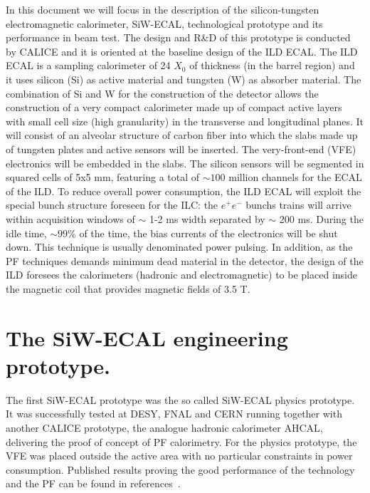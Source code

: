 \documentclass[a4paper,11pt]{article}
\begin{document}
In this document we will focus in the description of the silicon-tungsten electromagnetic calorimeter, SiW-ECAL, technological prototype
and its performance in beam test. The design and R\&D of this prototype is conducted by CALICE and it is oriented at the baseline design of the ILD ECAL.
The ILD ECAL is a sampling calorimeter of 24 $X_{0}$ of thickness (in the barrel region) and it
uses silicon (Si) as active material and tungsten (W) as absorber material.
The combination of Si and W for the construction of the detector allows
the construction of a very compact calorimeter made up of compact active layers with small cell size (high granularity) in the transverse and longitudinal planes.
It will consist of an alveolar structure of carbon fiber into which the slabs made up of tungsten
plates and active sensors will be inserted. The very-front-end (VFE) electronics will be
embedded in the slabs.
The silicon sensors will be segmented
in squared cells of 5x5 mm, featuring a total of $\sim 100$ million channels for the ECAL of the ILD.
To reduce overall power consumption, the ILD ECAL will exploit the special bunch structure
foreseen for the ILC: the $e^{+}e^{-}$ bunchs trains will arrive within
acquisition windows of $\sim$ 1-2 ms width separated by $\sim$ 200 ms. During the idle time, $\sim99\%$ of the time, the bias currents of the electronics will be shut down.
This technique is usually denominated power pulsing. In addition, as the PF techniques demands minimum dead material in the detector,
the design of the ILD foresees the calorimeters (hadronic and electromagnetic) to be placed inside the magnetic coil that provides magnetic fields of 3.5 T.

\section{The SiW-ECAL engineering prototype.}

The first SiW-ECAL prototype was the so called SiW-ECAL physics prototype.
It was successfully tested at DESY, FNAL and CERN running together with another CALICE prototype,
the analogue hadronic calorimeter AHCAL, delivering the proof of concept of PF calorimetry.
For the physics prototype, the VFE was placed outside the active area with no particular constraints in power consumption.
Published results proving the good performance of the technology and the PF can be found in references~\cite{Adloff:2011ha,Anduze:2008hq,Adloff:2008aa,Adloff:2010xj,CALICE:2011aa,Bilki:2014uep}.
\end{document}
